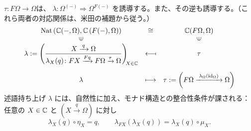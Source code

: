 \documentclass[
		head_space=20mm,
		foot_space=20mm,
		gutter=10mm,
		line_length=190mm
]{jlreq}
\begin{document}
\begin{supplement}[述語持ち上げ]
	 $\tau\colon F\Omega\to\Omega$は、 $\lambda\colon\Omega^{(-)}\Rightarrow\Omega^{F(-)}$ を誘導する。また、その逆も誘導する。（これら両者の対応関係は、米田の補題から従う。）
	\[\begin{array}{ccc}\mathrm{Nat}\left(\C(-,\Omega),\C\left(F(-),\Omega\right)\right) &\;\cong\; &\C(F\Omega,\Omega) \\ \rotatebox{90}{$\in$} && \rotatebox{90}{$\in$}\\ \lambda:=\left(\displaystyle\small\frac{X\xrightarrow{\;q\;}\Omega}{\lambda_X(q)\colon FX\xrightarrow{Fq}F\Omega\xrightarrow{\tau}\Omega}\right)_{\!\! X\in\C} & \reflectbox{$\longmapsto$} & \tau \\[20pt] \lambda & \longmapsto & \tau:=\left(F\Omega\xrightarrow{\;\lambda_{\Omega}(\id_\Omega)\;}\Omega\right)\end{array}\]
	述語持ち上げ $\lambda$ には、自然性に加え、モナド構造との整合性条件が課される： 任意の $X\in\mathbb{C}$ と $(X\xrightarrow{q}\Omega)$ に対し
	\[\lambda_X(q)\circ\eta_X=q,\qquad \lambda_{FX}(\lambda_X(q))=\lambda_X(q)\circ\mu_X.\]
\end{supplement}
\end{document}
